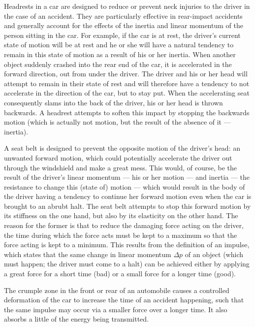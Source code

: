 Headrests in a car are designed to reduce or prevent neck injuries to the driver in the case of an accident. They are particularly effective in rear-impact accidents and generally account for the effects of the inertia and linear momentum of the person sitting in the car. For example, if the car is at rest, the driver's current state of motion will be at rest and he or she will have a natural tendency to remain in this state of motion as a result of his or her inertia. When another object suddenly crashed into the rear end of the car, it is accelerated in the forward direction, out from under the driver. The driver and his or her head will attempt to remain in their state of rest and will therefore have a tendency to not accelerate in the direction of the car, but to stay put. When the accelerating seat consequently slams into the back of the driver, his or her head is thrown backwards. A headrest attempts to soften this impact by stopping the backwards motion (which is actually not motion, but the result of the absence of it --- inertia).


A seat belt is designed to prevent the opposite motion of the driver's head: an unwanted forward motion, which could potentially accelerate the driver out through the windshield and make a great mess. This would, of course, be the result of the driver's linear momentum --- his or her motion --- and inertia --- the resistance to change this (state of) motion --- which would result in the body of the driver having a tendency to continue her forward motion even when the car is brought to an abrubt halt. The seat belt attempts to stop this forward motion by its stiffness on the one hand, but also by its elasticity on the other hand. The reason for the former is that to reduce the damaging force acting on the driver, the time during which the force acts must be kept to a maximum so that the force acting is kept to a minimum. This results from the definition of an impulse, which states that the same change in linear momentum $\Delta p$ of an object (which must happen; the driver must come to a halt) can be achieved either by applying a great force for a short time (bad) or a small force for a longer time (good).


The crumple zone in the front or rear of an automobile causes a controlled deformation of the car to increase the time of an accident happening, such that the same impulse may occur via a smaller force over a longer time. It also absorbs a little of the energy being transmitted.

